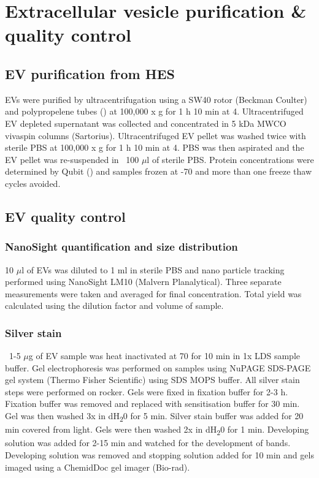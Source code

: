 \documentclass[a4paper]{report}
\begin{document}
\section{Extracellular vesicle purification \& quality control}
\subsection{EV purification from HES}
EVs were purified by ultracentrifugation using a SW40 rotor (Beckman Coulter) and polypropelene tubes () at 100,000 x g for 1 h 10 min at 4. Ultracentrifuged EV depleted supernatant was collected and concentrated in 5 kDa MWCO vivaspin columns (Sartorius). Ultracentrifuged EV pellet was washed twice with sterile PBS at 100,000 x g for 1 h 10 min at 4. PBS was then aspirated and the EV pellet was re-suspended in ~100 $\mu$l of sterile PBS. Protein concentrations were determined by Qubit () and samples frozen at -70 and more than one freeze thaw cycles avoided.
\subsection{EV quality control}
\subsubsection{NanoSight quantification and size distribution}
10 $\mu$l of EVs was diluted to 1 ml in sterile PBS and nano particle tracking performed using NanoSight LM10 (Malvern Planalytical). Three separate measurements were taken and averaged for final concentration. Total yield was calculated using the dilution factor and volume of sample.   
\subsubsection{Silver stain}
~1-5 $\mu$g of EV sample was heat inactivated at 70 for 10 min in 1x LDS sample buffer. Gel electrophoresis was performed on samples using NuPAGE SDS-PAGE gel system (Thermo Fisher Scientific) using SDS MOPS buffer. All silver stain steps were performed on rocker. Gels were fixed in fixation buffer for 2-3 h. Fixation buffer was removed and replaced with sensitisation buffer for 30 min. Gel was then washed 3x in dH\textsubscript{2}0 for 5 min. Silver stain buffer was added for 20 min covered from light. Gels were then washed 2x in dH\textsubscript{2}0 for 1 min. Developing solution was added for 2-15 min and watched for the development of bands. Developing solution was removed and stopping solution added for 10 min and gels imaged using a ChemidDoc gel imager (Bio-rad).
\end{document}
